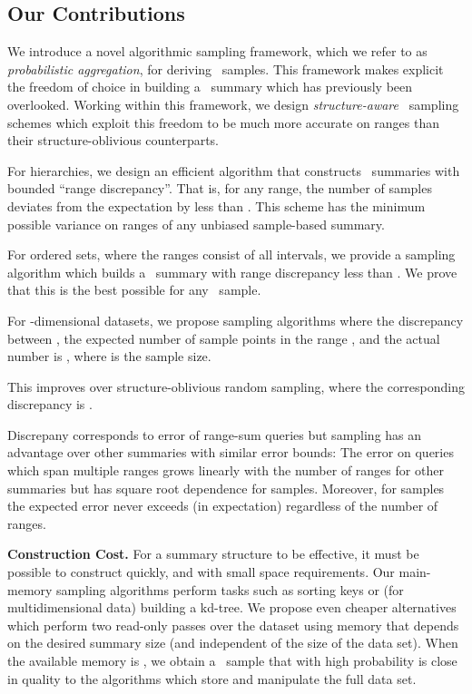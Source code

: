 \documentclass[11pt]{article}
\begin{document}
\subsection{Our Contributions}
\noindent
We introduce a novel algorithmic sampling framework, 
which we refer to as {\em probabilistic aggregation}, 
for deriving \varopt\ samples.   
This framework makes explicit the freedom of choice in building a
\varopt\ summary which has previously been overlooked. 
Working within this framework, we design {\em structure-aware} 
 \varopt\ sampling schemes which exploit this freedom 
 to be much more accurate on ranges than 
 their structure-oblivious counterparts.


\begin{list}{}{\leftmargin=1em}
\item
For hierarchies, we design an efficient algorithm that constructs
\varopt\ summaries with bounded ``range discrepancy''.
That is, for any range, the number of samples deviates 
from the expectation by less than .  
This scheme has the minimum possible variance on ranges of any
unbiased sample-based summary. 
\item For ordered sets, where the ranges consist of all intervals, 
we provide a sampling algorithm which builds a \varopt\ summary 
with range discrepancy less than . 
We prove that this is the best possible for any \varopt\ sample.
\item For -dimensional datasets, we propose sampling algorithms where
the discrepancy between  , the expected number of 
sample points in the range , and the actual number is 
 , 
where  is the sample size.
\end{list}
This improves over structure-oblivious random sampling, 
where the corresponding discrepancy is .

Discrepany corresponds to error of range-sum queries but
sampling has an advantage over other summaries
with similar error bounds:
The error on queries  which span multiple ranges grows linearly with the
number of ranges for other summaries but has square root dependence for samples. Moreover, for samples the expected error never exceeds  (in expectation) regardless of the number of ranges.

\smallskip
\noindent
{\bf Construction Cost.}
For a summary structure to be effective, it must be possible to
construct quickly, and with small space requirements. 
Our main-memory sampling algorithms perform tasks such as sorting
 keys or (for multidimensional data) building a kd-tree.  
We propose even cheaper alternatives which perform two read-only
 passes over the dataset using memory that depends on the desired
 summary size  (and independent of the size of the data set).  When
 the available memory is , 
we obtain a \varopt\ sample that with high probability 
 is close in quality to the algorithms which store and
manipulate the full data set. 
\end{document}
